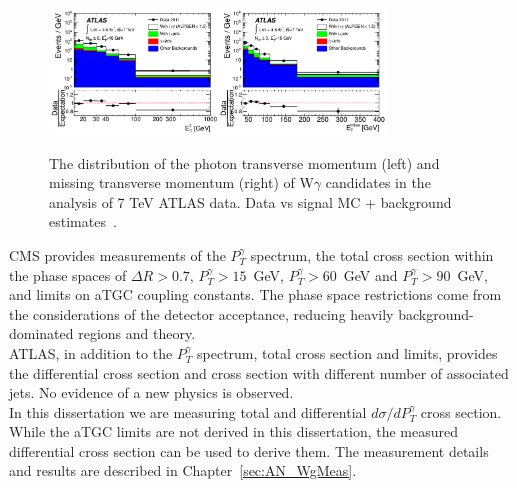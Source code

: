 \begin{figure}[htb]
  \begin{center}
    {\includegraphics[width=0.80\textwidth]{../figs/WgAbout/Wg7TeV_ATLAS_ptGamma.png}}
    \caption{The distribution of the photon transverse momentum (left) and missing transverse momentum (right) of W$\gamma$ candidates in the analysis of 7 TeV ATLAS data. Data vs signal MC + background estimates~\cite{ref_7TeV_ATLAS}. }
    \label{fig:Wg7TeV_ATLAS_ptGamma}
  \end{center}
\end{figure}

CMS provides measurements of the $P_T^\gamma$ spectrum, the total cross section within the phase spaces of $\Delta R>0.7$, $P_T^\gamma>15$~GeV, $P_T^\gamma>60$~GeV and $P_T^\gamma>90$~GeV, and limits on aTGC coupling constants. The phase space restrictions come from the considerations of the detector acceptance, reducing heavily background-dominated regions and theory.\\

ATLAS, in addition to the $P_T^\gamma$ spectrum, total cross section and limits, provides the differential cross section and cross section with different number of associated jets. No evidence of a new physics is observed.\\

In this dissertation we are measuring total and differential $d\sigma/d P_T^\gamma$ cross section. While the aTGC limits are not derived in this dissertation, the measured differential cross section can be used to derive them. The measurement details and results are described in Chapter~\ref{sec:AN_WgMeas}.\\
